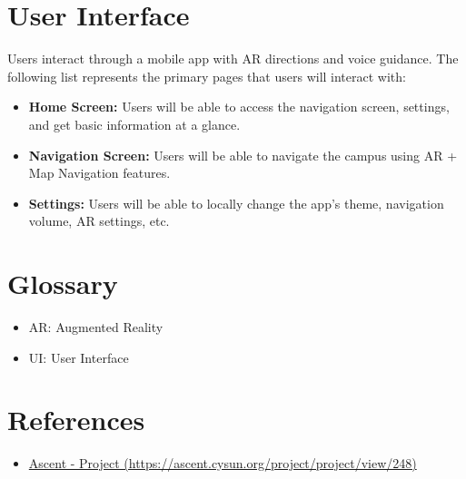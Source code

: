 \documentclass{article}
\begin{document}
\newpage
\section{User Interface}
Users interact through a mobile app with AR directions and voice guidance. The following list represents the primary pages that users will interact with:

\begin{itemize}
\item{\textbf{Home Screen:} Users will be able to access the navigation screen, settings, and get basic information at a glance.}
\item{\textbf{Navigation Screen:} Users will be able to navigate the campus using AR + Map Navigation features.}
\item{\textbf{Settings:} Users will be able to locally change the app's theme, navigation volume, AR settings, etc.}
\end{itemize}

\newpage
\section{Glossary}
\begin{itemize}
\item AR: Augmented Reality
\item UI: User Interface
\end{itemize}

\section{References}
\begin{itemize}
\item{\href{https://ascent.cysun.org/project/project/view/248}{Ascent - Project (https://ascent.cysun.org/project/project/view/248)}}
\end{itemize}
\end{document}
